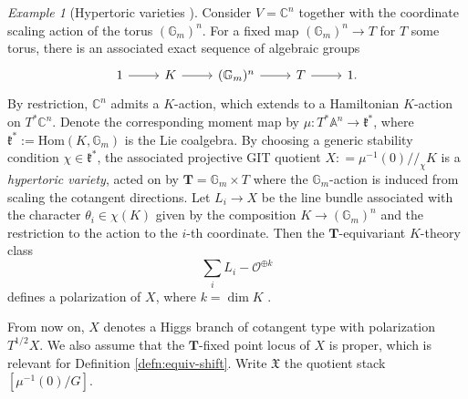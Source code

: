 \documentclass[reqno]{amsart}
\numberwithin{equation}{section}
\numberwithin{equation}{section}
\numberwithin{equation}{section}
\theoremstyle{definition}
\theoremstyle{remark}
\theoremstyle{remark}
\newtheorem{example}[thm]{Example}
\begin{document}
\begin{example}[Hypertoric varieties \cite{hyper-toric}]\label{exmp:hypertoric}
    Consider $V = \mathbb{C}^n$ together with the coordinate scaling action of the torus $(\mathbb{G}_m)^n$. For a fixed map $(\mathbb{G}_m)^n \to T$ for $T$ some torus, there is an associated exact sequence of algebraic groups
\begin{equation}
    \begin{tikzcd}
        1 \rar & K \rar & (\mathbb{G}_m)^n \rar & T \rar & 1.
    \end{tikzcd}
\end{equation}
By restriction, $\mathbb{C}^n$ admits a $K$-action, which extends to a Hamiltonian $K$-action on $T^*\mathbb{C}^n$. Denote the corresponding moment map by $\mu : T^*\mathbb{A}^n \to \mathfrak{k}^*$, where $\mathfrak{k}^* := \mathrm{Hom}(K, \mathbb{G}_m)$ is the Lie coalgebra. By choosing a generic stability condition $\chi \in \mathfrak{k}^*$, the associated projective GIT quotient $X : = \mu^{-1}(0)/\!\!/_\chi K$ is a \emph{hypertoric variety}, acted on by $\mathbf{T} = \mathbb{G}_m \times T$ where the $\mathbb{G}_m$-action is induced from scaling the cotangent directions. Let $L_i \to X$ be the line bundle associated with the character $\theta_i \in \chi(K)$ given by the composition $K \to (\mathbb{G}_m)^n$ and the restriction to the action to the $i$-th coordinate. Then the $\mathbf{T}$-equivariant $K$-theory class
\begin{equation}
    \sum_i L_i - \mathcal{O}^{\oplus k}
\end{equation}
defines a polarization of $X$, where $k = \dim K$ \cite{smirnov-zhou}.
\end{example}

From now on, $X$ denotes a Higgs branch of cotangent type with polarization $T^{1/2}X$. We also assume that the $\mathbf{T}$-fixed point locus of $X$ is proper, which is relevant for Definition \ref{defn:equiv-shift}. Write $\mathfrak{X}$ the quotient stack $[\mu^{-1}(0) / G]$. 
\end{document}

